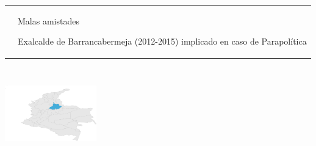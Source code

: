 \documentclass[letterpaper]{article}
\renewcommand{\arraystretch}{0}
\begin{document}
\begin{table}[h!]
 \setlength{\tabcolsep}{0pt}
\def\arraystretch{0}
  \begin{tabular}{m{4cm}m{12cm}}

    &
    \vspace{10pt} 

                \begin{center}
        \begin{ejbi-title}
        Malas amistades
        \end{ejbi-title}
        \end{center}
                      \begin{center}
      \begin{ejbi-subtitle}
      Exalcalde de Barrancabermeja (2012-2015) implicado en caso de
      Parapolítica
      \end{ejbi-subtitle}
      \end{center}
        \end{tabular}
\end{table}




\vspace{0.5cm}

\begin{center}\includegraphics[width=150px,height=150px]{built_report_files/figure-latex/unnamed-chunk-2-1} \end{center}
  

  
\vspace{0.5cm}
\end{document}
